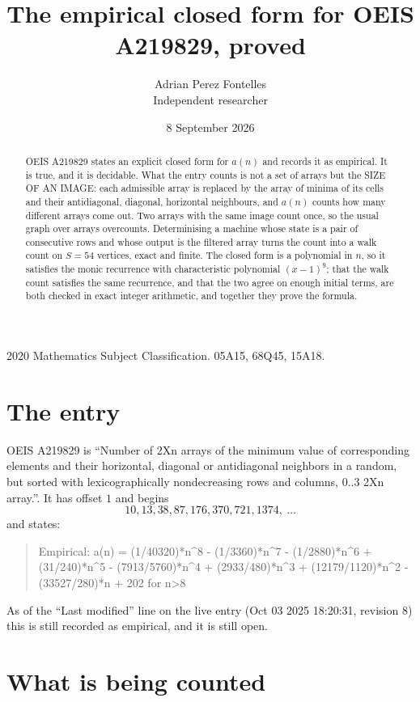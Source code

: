 \documentclass[11pt,a4paper]{article}
\title{The empirical closed form for OEIS A219829, proved}
\author{Adrian Perez Fontelles\\ \small Independent researcher}
\date{8 September 2026}
\theoremstyle{plain}
\theoremstyle{definition}
\begin{document}
\maketitle

\begin{abstract}
OEIS A219829 states an explicit closed form for $a(n)$ and records it as empirical. It is true, and
it is decidable. What the entry counts is not a set of arrays but the SIZE OF AN IMAGE: each
admissible array is replaced by the array of minima of its cells and their antidiagonal, diagonal, horizontal neighbours,
and $a(n)$ counts how many different arrays come out. Two arrays with the same image count
once, so the usual graph over arrays overcounts. Determinising a machine whose state is a pair
of consecutive rows and whose output is the filtered array turns the count into a walk count on
$S=54$ vertices, exact and finite. The closed form is a polynomial in $n$, so it satisfies the
monic recurrence with characteristic polynomial $(x-1)^{9}$; that the walk count
satisfies the same recurrence, and that the two agree on enough initial terms, are both checked
in exact integer arithmetic, and together they prove the formula.
\end{abstract}

\noindent\small 2020 Mathematics Subject Classification. 05A15, 68Q45, 15A18.\normalsize

\section{The entry}

OEIS A219829 is ``Number of 2Xn arrays of the minimum value of corresponding elements and their horizontal, diagonal or antidiagonal neighbors in a random, but sorted with lexicographically nondecreasing rows and columns, 0..3 2Xn array.''. It has offset $1$ and begins
\[
10, 13, 38, 87, 176, 370, 721, 1374,\ \dots
\]
and states:
\begin{quote}
Empirical: a(n) = (1/40320)*n\^{}8 - (1/3360)*n\^{}7 - (1/2880)*n\^{}6 + (31/240)*n\^{}5 - (7913/5760)*n\^{}4 + (2933/480)*n\^{}3 + (12179/1120)*n\^{}2 - (33527/280)*n + 202 for n>8
\end{quote}
As of the ``Last modified'' line on the live entry (Oct 03 2025 18:20:31, revision 8)
this is still recorded as empirical, and it is still open.

\section{What is being counted}
\end{document}

